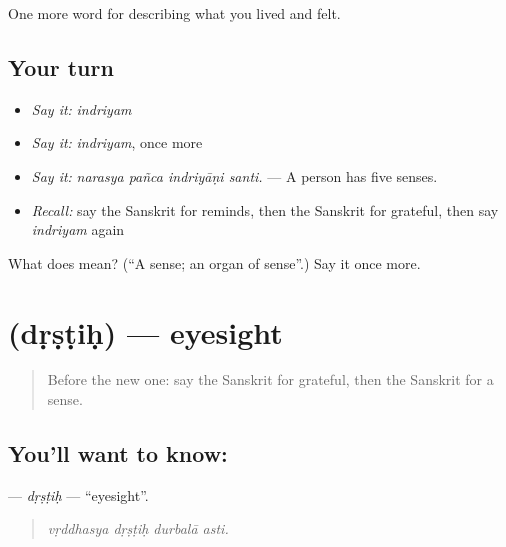 \begin{grammarlens}[title={What you've built}]
One more word for describing what you lived and felt.
\end{grammarlens}

\subsection*{Your turn}
\begin{itemize}
\raggedright
  \item \emph{Say it:} \emph{indriyam}
  \item \emph{Say it:} \emph{indriyam}, once more
  \item \emph{Say it:} \emph{narasya pañca indriyāṇi santi.} — A person has five senses.
  \item \emph{Recall:} say the Sanskrit for reminds, then the Sanskrit for grateful, then say \emph{indriyam} again
\end{itemize}

\begin{tcolorbox}[breakable,colback=teal!4,colframe=teal!35!black,title={Before you move on}]
What does  mean? (\textquotedblleft{}A sense; an organ of sense\textquotedblright{}.) Say it once more.
\end{tcolorbox}
\section[\texorpdfstring{\sk{दृष्टिः} (dṛṣṭiḥ)}{दृष्टिः (dṛṣṭiḥ)}]{ (dṛṣṭiḥ) — eyesight}

\label{lesson:SA-C469-drstih}



\begin{quote}
Before the new one: say the Sanskrit for grateful, then the Sanskrit for a sense.
\end{quote}

\subsection*{You'll want to know: }
\textbf{} — \emph{dṛṣṭiḥ} — \textquotedblleft{}eyesight\textquotedblright{}.

\begin{quote}
   
\end{quote}

\begin{quote}
\emph{vṛddhasya dṛṣṭiḥ durbalā asti.}
\end{quote}

